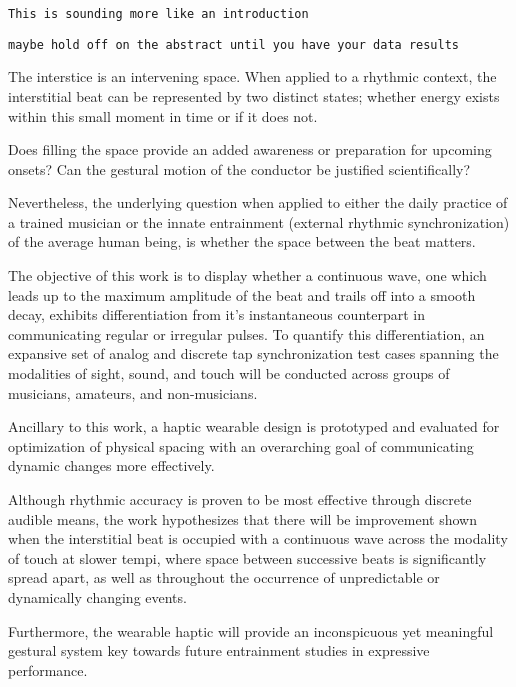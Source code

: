 
\setlength{\parskip}{1em}
\setlength{\parindent}{0em}

\noindent

\verb!This is sounding more like an introduction!

\verb!maybe hold off on the abstract until you have your data results!



The interstice is an intervening space. When applied to a rhythmic context, the interstitial beat can be represented by two distinct states; whether energy exists within this small moment in time or if it does not. 

Does filling the space provide an added awareness or preparation for upcoming onsets? Can the gestural motion of the conductor be justified scientifically?

Nevertheless, the underlying question when applied to either the daily practice of a trained musician or the innate entrainment (external rhythmic synchronization) of the average human being, is whether the space between the beat matters.

The objective of this work is to display whether a continuous wave, one which leads up to the maximum amplitude of the beat and trails off into a smooth decay, exhibits differentiation from it's instantaneous counterpart in communicating regular or irregular pulses. To quantify this differentiation, an expansive set of analog and discrete tap synchronization test cases spanning the modalities of sight, sound, and touch will be conducted across groups of musicians, amateurs, and non-musicians.

Ancillary to this work, a haptic wearable design is prototyped and evaluated for optimization of physical spacing with an overarching goal of communicating dynamic changes more effectively.

Although rhythmic accuracy is proven to be most effective through discrete audible means, the work hypothesizes that there will be improvement shown when the interstitial beat is occupied with a continuous wave across the modality of touch at slower tempi, where space between successive beats is significantly spread apart, as well as throughout the occurrence of unpredictable or dynamically changing events. 

Furthermore, the wearable haptic will provide an inconspicuous yet meaningful gestural system key towards future entrainment studies in expressive performance.

